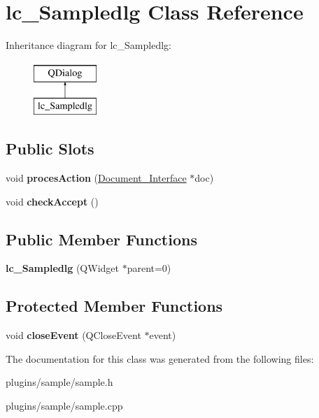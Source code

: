\hypertarget{classlc__Sampledlg}{\section{lc\-\_\-\-Sampledlg Class Reference}
\label{classlc__Sampledlg}
}
Inheritance diagram for lc\-\_\-\-Sampledlg\-:\begin{figure}[H]
\begin{center}
\leavevmode
\includegraphics[height=2.000000cm]{classlc__Sampledlg}
\end{center}
\end{figure}
\subsection*{Public Slots}
\begin{DoxyCompactItemize}
\item 
\hypertarget{classlc__Sampledlg_a3f44f3432b1b10b40355470d0711bb04}{void {\bfseries proces\-Action} (\hyperlink{classDocument__Interface}{Document\-\_\-\-Interface} $\ast$doc)}\label{classlc__Sampledlg_a3f44f3432b1b10b40355470d0711bb04}

\item 
\hypertarget{classlc__Sampledlg_a8a26e18c368cbe386b790a62c678910e}{void {\bfseries check\-Accept} ()}\label{classlc__Sampledlg_a8a26e18c368cbe386b790a62c678910e}

\end{DoxyCompactItemize}
\subsection*{Public Member Functions}
\begin{DoxyCompactItemize}
\item 
\hypertarget{classlc__Sampledlg_a6ac281b72d8d1f006bcd3d92fffb02c7}{{\bfseries lc\-\_\-\-Sampledlg} (Q\-Widget $\ast$parent=0)}\label{classlc__Sampledlg_a6ac281b72d8d1f006bcd3d92fffb02c7}

\end{DoxyCompactItemize}
\subsection*{Protected Member Functions}
\begin{DoxyCompactItemize}
\item 
\hypertarget{classlc__Sampledlg_a87d3a3768a420e160f976646bccbb583}{void {\bfseries close\-Event} (Q\-Close\-Event $\ast$event)}\label{classlc__Sampledlg_a87d3a3768a420e160f976646bccbb583}

\end{DoxyCompactItemize}


The documentation for this class was generated from the following files\-:\begin{DoxyCompactItemize}
\item 
plugins/sample/sample.\-h\item 
plugins/sample/sample.\-cpp\end{DoxyCompactItemize}
